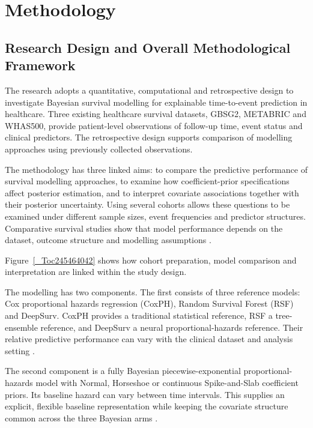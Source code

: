 \chapter{Methodology}\label{methodology}

\section{Research Design and Overall Methodological Framework}\label{research-design-and-overall-methodological-framework}

The research adopts a quantitative, computational and retrospective design to investigate Bayesian survival modelling for explainable time-to-event prediction in healthcare. Three existing healthcare survival datasets, GBSG2, METABRIC and WHAS500, provide patient-level observations of follow-up time, event status and clinical predictors. The retrospective design supports comparison of modelling approaches using previously collected observations.

The methodology has three linked aims: to compare the predictive performance of survival modelling approaches, to examine how coefficient-prior specifications affect posterior estimation, and to interpret covariate associations together with their posterior uncertainty. Using several cohorts allows these questions to be examined under different sample sizes, event frequencies and predictor structures. Comparative survival studies show that model performance depends on the dataset, outcome structure and modelling assumptions \cite{ref33,ref44}.

Figure~\ref{_Toc245464042} shows how cohort preparation, model comparison and interpretation are linked within the study design.



The modelling has two components. The first consists of three reference models: Cox proportional hazards regression (CoxPH), Random Survival Forest (RSF) and DeepSurv. CoxPH provides a traditional statistical reference, RSF a tree-ensemble reference, and DeepSurv a neural proportional-hazards reference. Their relative predictive performance can vary with the clinical dataset and analysis setting \cite{ref33,ref37}.

The second component is a fully Bayesian piecewise-exponential proportional-hazards model with Normal, Horseshoe or continuous Spike-and-Slab coefficient priors. Its baseline hazard can vary between time intervals. This supplies an explicit, flexible baseline representation while keeping the covariate structure common across the three Bayesian arms \cite{ref22,ref38}.

